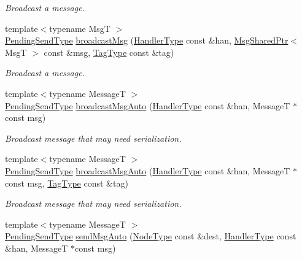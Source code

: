 \begin{DoxyCompactItemize}
\begin{DoxyCompactList}\small\item\em Broadcast a message. \end{DoxyCompactList}\item 
{\footnotesize template$<$typename MsgT $>$ }\\\hyperlink{structvt_1_1messaging_1_1_active_messenger_a3626a6ca76d8ad4ec7c3b47a2c70d3a8}{Pending\+Send\+Type} \hyperlink{group__preregister_ga5ac8b6da1678b07b521060cdc52b0101}{broadcast\+Msg} (\hyperlink{namespacevt_af64846b57dfcaf104da3ef6967917573}{Handler\+Type} const \&han, \hyperlink{structvt_1_1messaging_1_1_msg_shared_ptr}{Msg\+Shared\+Ptr}$<$ MsgT $>$ const \&msg, \hyperlink{namespacevt_a84ab281dae04a52a4b243d6bf62d0e52}{Tag\+Type} const \&tag)
\begin{DoxyCompactList}\small\item\em Broadcast a message. \end{DoxyCompactList}\item 
{\footnotesize template$<$typename MessageT $>$ }\\\hyperlink{structvt_1_1messaging_1_1_active_messenger_a3626a6ca76d8ad4ec7c3b47a2c70d3a8}{Pending\+Send\+Type} \hyperlink{group__preregister_ga9dc42ebe9b72717dbc7d63733aa832ff}{broadcast\+Msg\+Auto} (\hyperlink{namespacevt_af64846b57dfcaf104da3ef6967917573}{Handler\+Type} const \&han, MessageT $\ast$const msg)
\begin{DoxyCompactList}\small\item\em Broadcast message that may need serialization. \end{DoxyCompactList}\item 
{\footnotesize template$<$typename MessageT $>$ }\\\hyperlink{structvt_1_1messaging_1_1_active_messenger_a3626a6ca76d8ad4ec7c3b47a2c70d3a8}{Pending\+Send\+Type} \hyperlink{group__preregister_gad5dda6ea8eb86471347572ec0ee0b26a}{broadcast\+Msg\+Auto} (\hyperlink{namespacevt_af64846b57dfcaf104da3ef6967917573}{Handler\+Type} const \&han, MessageT $\ast$const msg, \hyperlink{namespacevt_a84ab281dae04a52a4b243d6bf62d0e52}{Tag\+Type} const \&tag)
\begin{DoxyCompactList}\small\item\em Broadcast message that may need serialization. \end{DoxyCompactList}\item 
{\footnotesize template$<$typename MessageT $>$ }\\\hyperlink{structvt_1_1messaging_1_1_active_messenger_a3626a6ca76d8ad4ec7c3b47a2c70d3a8}{Pending\+Send\+Type} \hyperlink{group__preregister_ga3453709452e704b60bc41a13ec7b0b4e}{send\+Msg\+Auto} (\hyperlink{namespacevt_a866da9d0efc19c0a1ce79e9e492f47e2}{Node\+Type} const \&dest, \hyperlink{namespacevt_af64846b57dfcaf104da3ef6967917573}{Handler\+Type} const \&han, MessageT $\ast$const msg)

\end{DoxyCompactItemize}
